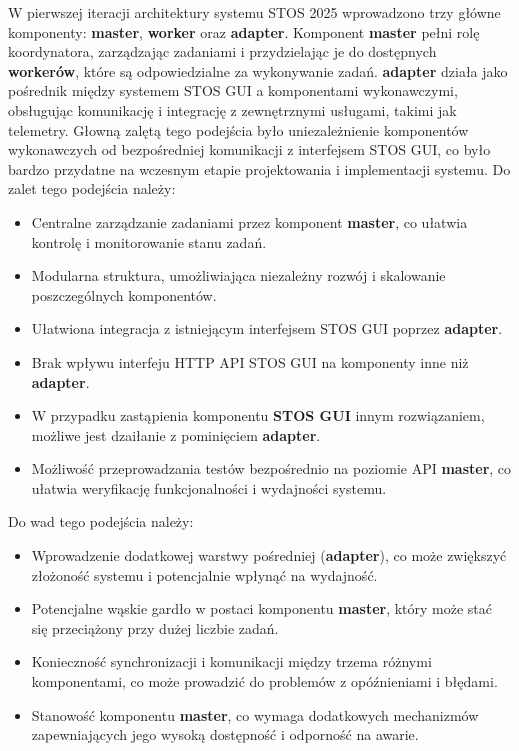 \documentclass[12pt,a4paper]{article}
\begin{document}
W pierwszej iteracji architektury systemu STOS 2025 wprowadzono trzy główne komponenty: \textbf{master}, \textbf{worker} oraz \textbf{adapter}. Komponent \textbf{master} pełni rolę koordynatora, zarządzając zadaniami i przydzielając je do dostępnych \textbf{workerów}, które są odpowiedzialne za wykonywanie zadań. \textbf{adapter} działa jako pośrednik między systemem STOS GUI a komponentami wykonawczymi, obsługując komunikację i integrację z zewnętrznymi usługami, takimi jak telemetry. Głowną zalętą tego podejścia było uniezależnienie komponentów wykonawczych od bezpośredniej komunikacji z interfejsem STOS GUI, co było bardzo przydatne na wczesnym etapie projektowania i implementacji systemu.
Do zalet tego podejścia należy:
\begin{itemize}
    \item Centralne zarządzanie zadaniami przez komponent \textbf{master}, co ułatwia kontrolę i monitorowanie stanu zadań.
    \item Modularna struktura, umożliwiająca niezależny rozwój i skalowanie poszczególnych komponentów.
    \item Ułatwiona integracja z istniejącym interfejsem STOS GUI poprzez \textbf{adapter}.
    \item Brak wpływu interfeju HTTP API STOS GUI na komponenty inne niż \textbf{adapter}.
    \item W przypadku zastąpienia komponentu \textbf{STOS GUI} innym rozwiązaniem, możliwe jest dzaiłanie z pominięciem \textbf{adapter}.
    \item Możliwość przeprowadzania testów bezpośrednio na poziomie API \textbf{master}, co ułatwia weryfikację funkcjonalności i wydajności systemu.
\end{itemize}
Do wad tego podejścia należy:
\begin{itemize}
    \item Wprowadzenie dodatkowej warstwy pośredniej (\textbf{adapter}), co może zwiększyć złożoność systemu i potencjalnie wpłynąć na wydajność.
    \item Potencjalne wąskie gardło w postaci komponentu \textbf{master}, który może stać się przeciążony przy dużej liczbie zadań.
    \item Konieczność synchronizacji i komunikacji między trzema różnymi komponentami, co może prowadzić do problemów z opóźnieniami i błędami.
    \item Stanowość komponentu \textbf{master}, co wymaga dodatkowych mechanizmów zapewniających jego wysoką dostępność i odporność na awarie.
\end{itemize}
\end{document}
